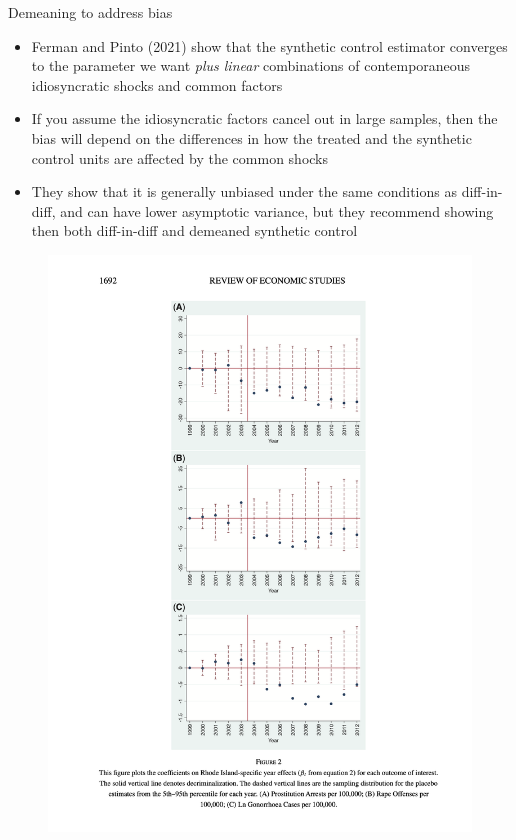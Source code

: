 \documentclass{beamer}
\begin{document}
\begin{frame}{Demeaning to address bias}

\begin{itemize}
\item Ferman and Pinto (2021) show that the synthetic control estimator converges to the parameter we want \emph{plus linear} combinations of contemporaneous idiosyncratic shocks and common factors
\item If you assume the idiosyncratic factors cancel out in large samples, then the bias will depend on the differences in how the treated and the synthetic control units are affected by the common shocks
\item They show that it is generally unbiased under the same conditions as diff-in-diff, and can have lower asymptotic variance, but they recommend showing then both diff-in-diff and demeaned synthetic control

\end{itemize}

\end{frame}


\begin{frame}{}

\begin{figure}
\includegraphics[scale=0.25]{./lecture_includes/restud_dd}
\end{figure}

\end{frame}
\end{document}
